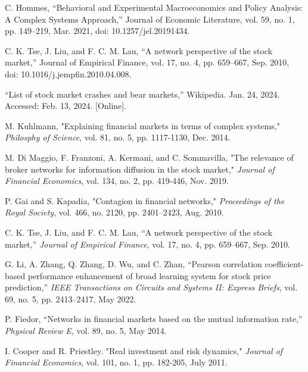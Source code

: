 \documentclass[letterpaper, 10 pt, proceedings]{ieeetran}  %
\begin{document}
\begin{thebibliography}{99}
		C. Hommes, “Behavioral and Experimental Macroeconomics and Policy Analysis: A Complex Systems Approach,” Journal of Economic Literature, vol. 59, no. 1, pp. 149–219, Mar. 2021, doi: 10.1257/jel.20191434.
		
		C. K. Tse, J. Liu, and F. C. M. Lau, “A network perspective of the stock market,” Journal of Empirical Finance, vol. 17, no. 4, pp. 659–667, Sep. 2010, doi: 10.1016/j.jempfin.2010.04.008.
		
		“List of stock market crashes and bear markets,” Wikipedia. Jan. 24, 2024. Accessed: Feb. 13, 2024. [Online].
		
		M. Kuhlmann, "Explaining financial markets in terms of complex systems," \textit{Philosphy of Science}, vol. 81, no. 5, pp. 1117-1130, Dec. 2014. %
		
		M. Di Maggio, F. Franzoni, A. Kermani, and C. Sommavilla, "The relevance of broker networks for information diffusion in the stock market," \textit{Journal of Financial Economics}, vol. 134, no. 2, pp. 419-446, Nov. 2019. %
		
		
		P. Gai and S. Kapadia, "Contagion in financial networks," \textit{Proceedings of the Royal Society}, vol. 466, no. 2120, pp. 2401–2423, Aug. 2010.
		
		C. K. Tse, J. Liu, and F. C. M. Lau, “A network perspective of the stock market,” \textit{Journal of Empirical Finance}, vol. 17, no. 4, pp. 659–667, Sep. 2010. %
		
		G. Li, A. Zhang, Q. Zhang, D. Wu, and C. Zhan, “Pearson correlation coefficient-based performance enhancement of broad learning system for stock price prediction,” \textit{IEEE Transactions on Circuits and Systems II: Express Briefs}, vol. 69, no. 5, pp. 2413–2417, May 2022. %
		
		P. Fiedor, “Networks in financial markets based on the mutual information rate,” \textit{Physical Review E}, vol. 89, no. 5, May 2014. %
		
		I. Cooper and R. Priestley. "Real investment and risk dynamics," \textit{Journal of Financial Economics}, vol. 101, no. 1, pp. 182-205, July 2011.
		

\end{thebibliography}
\end{document}
